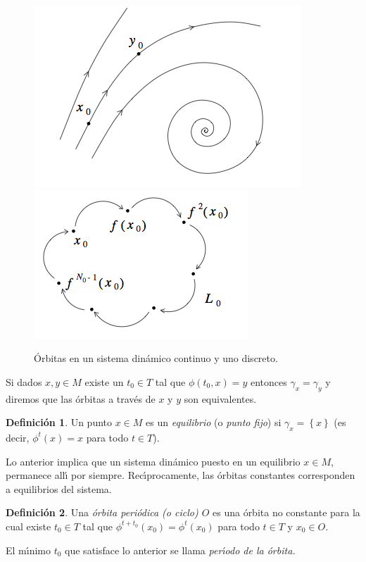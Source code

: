 \documentclass[11pt]{book}
\theoremstyle{definition}
\newtheorem{definition}{Definición}
\numberwithin{definition}{section}
\theoremstyle{theorem}
\numberwithin{theorem}{section}
\numberwithin{lemma}{section}
\numberwithin{corollary}{section}
\theoremstyle{plain}
\numberwithin{example}{section}
\begin{document}
\begin{figure} \centering \label{fig:orbits}
    \includegraphics[scale=0.5]{figures/orbit-continuous.png}
    \includegraphics[scale=0.5]{figures/orbit-discrete.png}    
    \caption{Órbitas en un sistema dinámico continuo y uno discreto.}
\end{figure}

Si dados $x, y \in M$ existe un $t_0 \in T$ tal que $\phi \left( t_0, x
\right) = y$ entonces $\gamma_x = \gamma_y$ y diremos que las \'orbitas a
trav\'es de $x$ y $y$ son equivalentes.

\begin{definition}
  \label{def:equilibrium}Un punto $x \in M$ es un {\emph{equilibrio}} (o
  {\emph{punto fijo}}) si $\gamma_x = \left\{ x \right\}$ (es decir,
  $\phi^t \left( x \right) = x$ para todo $t \in T$).
\end{definition}

Lo anterior implica que un sistema din\'amico puesto en un equilibrio $x
\in M$, permanece all\'{\i} por siempre. Rec\'{\i}procamente, las \'orbitas
constantes corresponden a equilibrios del sistema.

\begin{definition}
  \label{def:periodicorbit}Una {\emph{\'orbita peri\'odica (o ciclo) $O$}}
  es una \'orbita no constante para la cual existe $t_0 \in T$ tal que
  $\phi^{t + t_0} \left( x_0 \right) = \phi^t \left( x_0 \right)$ para todo $t
  \in T$ y $x_0 \in O$.
  
  El m\'{\i}nimo $t_0$ que satisface lo anterior se llama
  {\emph{per\'{\i}odo de la \'orbita.}}
\end{definition}
\end{document}
